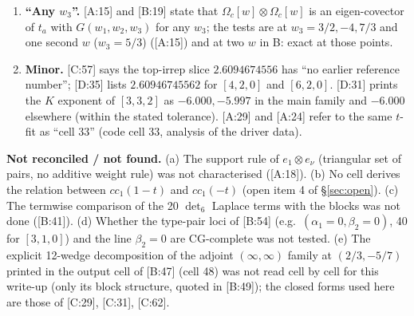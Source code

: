 \documentclass[10pt]{article}
\newcommand{\cl}[2]{\textsf{[#1:#2]}}
\newcommand{\Om}{\Omega}
\begin{document}
\begin{enumerate}
\item \textbf{``Any $w_3$''.} \cl{A}{15} and \cl{B}{19} state that $\Om_c[w]\otimes\Om_c[w]$ is an eigen-covector of $t_a$ with $G(w_1,w_2,w_3)$ for any $w_3$; the tests are at $w_3=3/2,-4,7/3$ and one second $w$ ($w_3=5/3$) (\cl{A}{15}) and at two $w$ in B: exact at those points.
\item \textbf{Minor.} \cl{C}{57} says the top-irrep slice $2.6094674556$ has ``no earlier reference number''; \cl{D}{35} lists $2.60946745562$ for $[4,2,0]$ and $[6,2,0]$. \cl{D}{31} prints the $K$ exponent of $[3,3,2]$ as $-6.000,-5.997$ in the main family and $-6.000$ elsewhere (within the stated tolerance). \cl{A}{29} and \cl{A}{24} refer to the same $t$-fit as ``cell 33'' (code cell 33, analysis of the driver data).
\end{enumerate}

\textbf{Not reconciled / not found.} (a) The support rule of $e_1\otimes e_\nu$ (triangular set of pairs, no additive weight rule) was not characterised (\cl{A}{18}). (b) No cell derives the relation between $cc_1(1-t)$ and $cc_1(-t)$ (open item 4 of \S\ref{sec:open}). (c) The termwise comparison of the 20 $\det_6$ Laplace terms with the blocks was not done (\cl{B}{41}). (d) Whether the type-pair loci of \cl{B}{54} (e.g.\ $(\alpha_1=0,\beta_2=0)$, 40 for $[3,1,0]$) and the line $\beta_2=0$ are CG-complete was not tested. (e) The explicit 12-wedge decomposition of the adjoint $(\infty,\infty)$ family at $(2/3,-5/7)$ printed in the output cell of \cl{B}{47} (cell 48) was not read cell by cell for this write-up (only its block structure, quoted in \cl{B}{49}); the closed forms used here are those of \cl{C}{29}, \cl{C}{31}, \cl{C}{62}.
\end{document}
